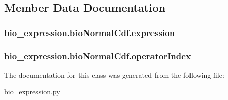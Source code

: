 \subsection{Member Data Documentation}
\hypertarget{classbio__expression_1_1bio_normal_cdf_a072f5a5a5a9d3d142c8314f89ea0a656}{
\subsubsection[{expression}]{\setlength{\rightskip}{0pt plus 5cm}bio\+\_\+expression.\+bio\+Normal\+Cdf.\+expression}}\label{classbio__expression_1_1bio_normal_cdf_a072f5a5a5a9d3d142c8314f89ea0a656}
\hypertarget{classbio__expression_1_1bio_normal_cdf_aa53261a1e8c2adb0080b545da7e74f0c}{
\subsubsection[{operator\+Index}]{\setlength{\rightskip}{0pt plus 5cm}bio\+\_\+expression.\+bio\+Normal\+Cdf.\+operator\+Index}}\label{classbio__expression_1_1bio_normal_cdf_aa53261a1e8c2adb0080b545da7e74f0c}


The documentation for this class was generated from the following file\+:\begin{DoxyCompactItemize}
\item 
\hyperlink{bio__expression_8py}{bio\+\_\+expression.\+py}\end{DoxyCompactItemize}
